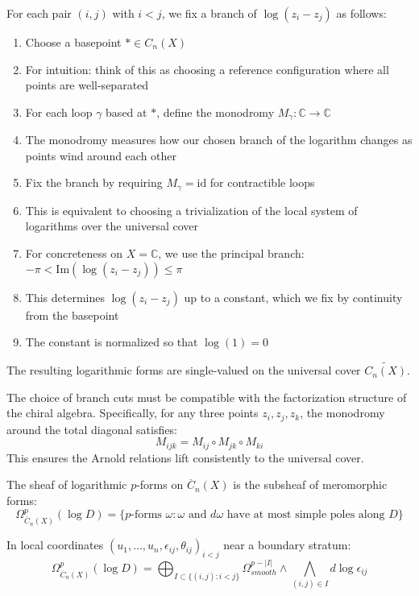 \begin{definition}
For each pair $(i,j)$ with $i < j$, we fix a branch of $\log(z_i - z_j)$ as follows:
\begin{enumerate}
\item Choose a basepoint $* \in C_n(X)$
\item For intuition: think of this as choosing a reference configuration where all points are well-separated

\item For each loop $\gamma$ based at $*$, define the monodromy $M_\gamma: \mathbb{C} \to \mathbb{C}$
\item The monodromy measures how our chosen branch of the logarithm changes as points wind around each other

\item Fix the branch by requiring $M_\gamma = \text{id}$ for contractible loops
\item This is equivalent to choosing a trivialization of the local system of logarithms over the universal cover
\item For concreteness on $X = \mathbb{C}$, we use the principal branch: $-\pi < \text{Im}(\log(z_i - z_j)) \leq \pi$

\item This determines $\log(z_i - z_j)$ up to a constant, which we fix by continuity from the basepoint
\item The constant is normalized so that $\log(1) = 0$
\end{enumerate}
The resulting logarithmic forms are single-valued on the universal cover $\widetilde{C_n(X)}$.
\end{definition}

\begin{remark} The choice of branch cuts must be compatible with the factorization structure of the chiral algebra. Specifically, for any three points $z_i, z_j, z_k$, the monodromy around the total diagonal satisfies:
$$M_{ijk} = M_{ij} \circ M_{jk} \circ M_{ki}$$
This ensures the Arnold relations lift consistently to the universal cover.
\end{remark}

\begin{definition}
The sheaf of logarithmic $p$-forms on $\overline{C}_n(X)$ is the subsheaf of meromorphic forms:
$$\Omega^p_{\overline{C}_n(X)}(\log D) = \{p\text{-forms } \omega : \omega \text{ and } d\omega \text{ have at most simple poles along } D\}$$

In local coordinates $(u_1,\ldots,u_n,\epsilon_{ij},\theta_{ij})_{i<j}$ near a boundary stratum:
$$\Omega^p_{\overline{C}_n(X)}(\log D) = \bigoplus_{I \subset \{(i,j): i<j\}} \Omega^{p-|I|}_{smooth} \wedge \bigwedge_{(i,j) \in I} d\log\epsilon_{ij}$$
\end{definition}


